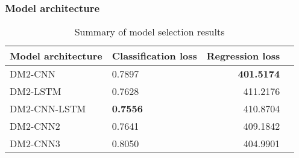\subsubsection{Model architecture}
\label{sub:comb_model_architecture}




\begin{table}
\begin{tabular}{llrr}
\toprule
Model architecture & Classification loss & Regression loss \\
\midrule
DM2-CNN & 0.7897 & \textbf{401.5174} \\
DM2-LSTM & 0.7628 & 411.2176 \\
DM2-CNN-LSTM & \textbf{0.7556} & 410.8704 \\
DM2-CNN2 & 0.7641 & 409.1842 \\
DM2-CNN3 & 0.8050 & 404.9901 \\
\bottomrule
\end{tabular}
\caption{Summary of model selection results}
\label{tab:dm2_selection_results}
\end{table}
